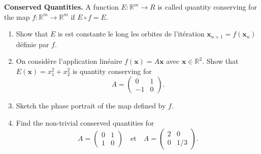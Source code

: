 \documentclass{article}
\begin{document}
\begin{question}
  \textbf{Conserved Quantities.}
  A function $E:\mathbb R^m \to R$ is called quantity conserving for the map $f:\mathbb R^m \to \mathbb R^m$ if $E\circ f = E$.  
  
  
    \begin{enumerate}[label=(\alph*)]
    \item Show that $E$ is est constante le long les orbites de l'it\'eration $\bm x_{n+1} = f(\bm x_n)$ d\'efinie par $f$.

    \item On consid\`ere l'application lin\'eaire $f(\bm x) = A \bm x$ avec $\bm x\in\mathbb R^2$. Show that $E(\bm x) = x_1^2+x_2^2$ is quantity conserving for
    \begin{equation}
      A = \begin{pmatrix}
        0 & 1\\
        -1 & 0
      \end{pmatrix}.
    \end{equation}
    \item Sketch the phase portrait of the map defined by $f$.
    \item Find the non-trivial conserved quantities for 
    \begin{equation}
      A = \begin{pmatrix}
        0 & 1\\
        1 & 0
      \end{pmatrix}
      \quad 
      \text{et}
      \quad
      A = \begin{pmatrix}
        2 & 0\\
        0 & 1/3
      \end{pmatrix}.
    \end{equation}
  \end{enumerate}
\end{question}
\end{document}
